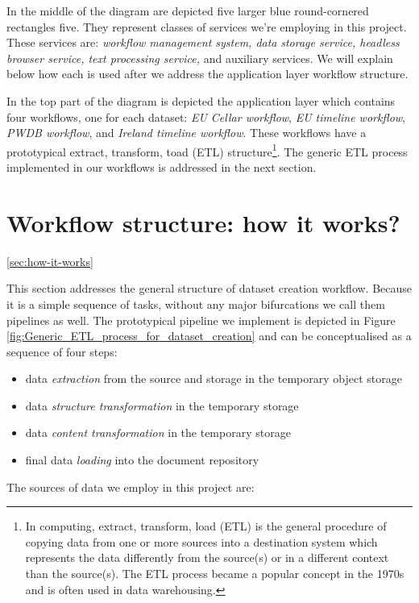 In the middle of the diagram are depicted five larger blue round-cornered rectangles five. They represent classes of services we're employing in this project. These services are: \textit{workflow management system, data} \textit{storage service, headless browser service, text processing service, }and auxiliary services. We will explain below how each is used after we address the application layer workflow structure. 

In the top part of the diagram is depicted the application layer which contains four workflows, one for each dataset: \textit{EU Cellar workflow}, \textit{EU timeline workflow}, \textit{PWDB workflow}, and \textit{Ireland timeline workflow}. These workflows have a prototypical extract, transform, toad (ETL) structure\footnote{ In computing, extract, transform, load (ETL) is the general procedure of copying data from one or more sources into a destination system which represents the data differently from the source(s) or in a different context than the source(s). The ETL process became a popular concept in the 1970s and is often used in data warehousing. }. The generic ETL process implemented in our workflows is addressed in the next section.

\section{Workflow structure: how it works? }
\ref{sec:how-it-works}

This section addresses the general structure of dataset creation workflow. Because it is a simple sequence of tasks, without any major bifurcations we call them pipelines as well. The prototypical pipeline we implement is depicted in Figure \ref{fig:Generic_ETL_process_for_dataset_creation} and can be conceptualised as a sequence of four steps: 

\begin{itemize}
	\item data\textit{ extraction} from the source and storage in the temporary object storage
	\item data \textit{structure transformation} in the temporary storage
	\item data \textit{content transformation} in the temporary storage

	\item final data\textit{ loading} into the document repository
\end{itemize}

The sources of data we employ in this project are: 

